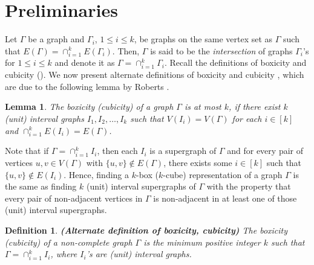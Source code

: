 \documentclass[twoside, 11pt]{article}
\newtheorem{definition}{Definition}
\newtheorem{lemma}{Lemma}
\newcommand{\G}{\Gamma}
\begin{document}
\section{Preliminaries}\label{preli}
Let $\G$ be a graph and $\G_i$, $1 \leq i \leq k$, be graphs on the same vertex set as $\G$ such that $E(\G) = \cap_{i=1}^{k}E(\G_i)$. Then, $\G$ is said to be the \textit{intersection} of graphs $\G_i$'s for $1 \leq i \leq k$ and denote it as $\G = \cap_{i=1}^{k}\G_i$. Recall the definitions of boxicity and cubicity (). We now present alternate definitions of boxicity and cubicity \cite{MR0252268}, which are due to the following lemma by Roberts \cite{MR0252268}.
         

\begin{lemma}\cite{MR0252268} The boxicity (cubicity) of a graph $\G$ is at most $k$, if there exist $k$ (unit) interval graphs $I_1, I_2, \dots, I_k$ such that $V(I_i)=V(\G)$ for each $i \in [k]$ and $\cap_{i=1}^k E(I_i) = E(\G)$.
    
\end{lemma}

Note that if $\G = \cap_{i=1}^k I_i $, then each $I_i$ is a supergraph of $\G$ and for every pair of vertices $u, v \in V(\G)$ with $\{u,v\} \notin E(\G)$, there exists some $i \in [k]$ such that $\{u,v\} \notin E(I_i)$. Hence, finding a $k$-box ($k$-cube) representation of a graph $\G$ is the same as finding $k$ (unit) interval supergraphs of $\G$ with the property that every pair of non-adjacent vertices in $\G$ is non-adjacent in at least one of those (unit) interval supergraphs.

\begin{definition}\label{boxicity def 2}\textbf{(Alternate definition of boxicity, cubicity)} The \emph{boxicity (cubicity)} of a non-complete graph $\G$ is the minimum positive integer $k$ such that $\G = \cap_{i=1}^k I_i $, where $I_i$'s are (unit) interval graphs.
    
\end{definition}
\end{document}
